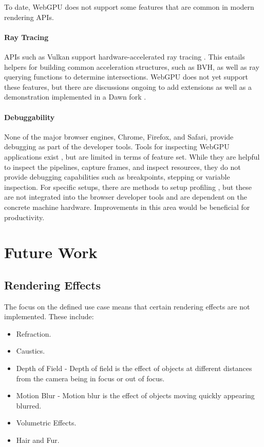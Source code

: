 To date, WebGPU does not support some features that are common in modern rendering APIs.

\paragraph{Ray Tracing}

\glspl{API} such as Vulkan support hardware-accelerated ray tracing \cite{vulkanRayTracing}. This entails helpers for building common acceleration structures, such as \gls{BVH}, as well as ray querying functions to determine intersections. WebGPU does not yet support these features, but there are discussions ongoing to add extensions \cite{webGPURayTracing} as well as a demonstration implemented in a Dawn fork \cite{webGPURayTracingFork}.

\paragraph{Debuggability}

None of the major browser engines, Chrome, Firefox, and Safari, provide debugging as part of the developer tools. Tools for inspecting WebGPU applications exist \cite{webGpuDevToolsDuncan, webGpuDevToolsTakahiro}, but are limited in terms of feature set. While they are helpful to inspect the pipelines, capture frames, and inspect resources, they do not provide debugging capabilities such as breakpoints, stepping or variable inspection. For specific setups, there are methods to setup profiling \cite{webGpuProfilingWithPix}, but these are not integrated into the browser developer tools and are dependent on the concrete machine hardware. Improvements in this area would be beneficial for productivity.


\section{Future Work}

\subsection*{Rendering Effects}

The focus on the defined use case means that certain rendering effects are not implemented. These include:

\begin{itemize}
    \item{Refraction}.
    \item{Caustics}.
    \item {Depth of Field} - Depth of field is the effect of objects at different distances from the camera being in focus or out of focus.
    \item {Motion Blur} - Motion blur is the effect of objects moving quickly appearing blurred.
    \item{Volumetric Effects}.
    \item{Hair and Fur}.
\end{itemize}

